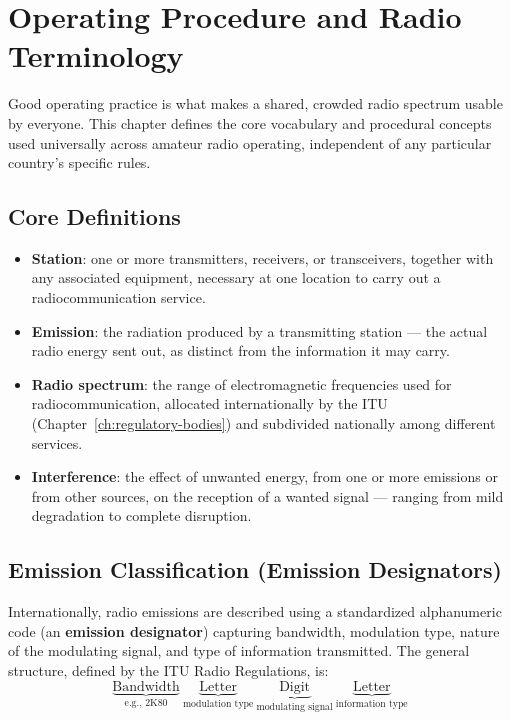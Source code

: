 \chapter{Operating Procedure and Radio Terminology}
\label{ch:operating-procedures}

Good operating practice is what makes a shared, crowded radio spectrum
usable by everyone. This chapter defines the core vocabulary and
procedural concepts used universally across amateur radio operating,
independent of any particular country's specific rules.

\section{Core Definitions}

\begin{itemize}
\item \textbf{Station}: one or more transmitters, receivers, or
transceivers, together with any associated equipment, necessary at one
location to carry out a radiocommunication service.
\item \textbf{Emission}: the radiation produced by a transmitting
station --- the actual radio energy sent out, as distinct from the
information it may carry.
\item \textbf{Radio spectrum}: the range of electromagnetic frequencies
used for radiocommunication, allocated internationally by the ITU
(Chapter~\ref{ch:regulatory-bodies}) and subdivided nationally among
different services.
\item \textbf{Interference}: the effect of unwanted energy, from one or
more emissions or from other sources, on the reception of a wanted
signal --- ranging from mild degradation to complete disruption.
\end{itemize}

\section{Emission Classification (Emission Designators)}

Internationally, radio emissions are described using a standardized
alphanumeric code (an \textbf{emission designator}) capturing bandwidth,
modulation type, nature of the modulating signal, and type of
information transmitted. The general structure, defined by the ITU
Radio Regulations, is:
\[
\underbrace{\text{Bandwidth}}_{\text{e.g., 2K80}}\ \underbrace{\text{Letter}}_{\text{modulation type}}\ \underbrace{\text{Digit}}_{\text{modulating signal}}\ \underbrace{\text{Letter}}_{\text{information type}}
\]

